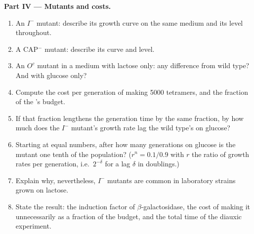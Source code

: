 \begin{problem}
\medskip
\noindent\textbf{Part IV --- Mutants and costs.}
\begin{enumerate}[resume]
  \item An $I^-$ mutant: describe its growth curve on the same medium
        and its  level throughout.
  \item A CAP$^-$ mutant: describe its curve and  level.
  \item An $O^c$ mutant in a medium with lactose only: any difference
        from wild type? And with glucose only?
  \item Compute the  cost per generation of making \num{5000}
        tetramers, and the fraction of the 's budget.
  \item If that fraction lengthens the generation time by the same
        fraction, by how much does the $I^-$ mutant's growth rate lag
        the wild type's on glucose?
  \item Starting at equal numbers, after how many generations on
        glucose is the mutant one tenth of the population? ($r^n =
        0.1/0.9$ with $r$ the ratio of growth rates per generation,
        i.e.\ $2^{-\delta}$ for a lag $\delta$ in doublings.)
  \item Explain why, nevertheless, $I^-$ mutants are common in
        laboratory strains grown on lactose.
  \item State the result: the induction factor of
        $\beta$-galactosidase, the cost of making it unnecessarily as
        a fraction of the  budget, and the total time of the
        diauxic experiment.
\end{enumerate}
\end{problem}
